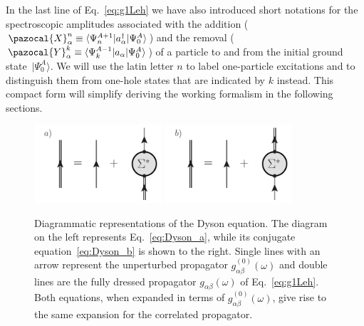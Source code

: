 %
In the last line of Eq.~\eqref{eq:g1Leh} we have also introduced short notations for the spectroscopic amplitudes associated with the addition
($\pazocal{X}^{n}_\alpha \equiv \langle\Psi^{A+1}_n\vert  a^\dagger_\alpha  \vert\Psi^A_0\rangle$) and the removal
($\pazocal{Y}^{k}_\alpha \equiv \langle\Psi^{A-1}_k\vert  a_\alpha  \vert\Psi^A_0\rangle$)  of a particle to and from the initial ground state~$\vert\Psi^A_0\rangle$.
We will use the latin letter  $n$ to label one-particle excitations and to distinguish them from one-hole states that are indicated by $k$ instead.
 This compact form will simplify deriving the working formalism in the following sections. 


\begin{figure}[t]
\begin{center}
\includegraphics[width=0.42\textwidth]{Chapter11-figures/fig11_1_a.pdf}   \hspace{0.08\textwidth} 
\includegraphics[width=0.42\textwidth]{Chapter11-figures/fig11_1_b.pdf}
\caption{Diagrammatic representations of the Dyson equation. The diagram on the left represents Eq.~\eqref{eq:Dyson_a}, while its conjugate equation~\eqref{eq:Dyson_b} is shown to the right. Single lines with an
arrow represent the unperturbed propagator $g^{(0)}_{\alpha\beta}(\omega)$ and  double lines are the fully
dressed propagator $g_{\alpha\beta}(\omega)$ of Eq.~\eqref{eq:g1Leh}.  Both equations, when expanded in terms
of $g^{(0)}_{\alpha\beta}(\omega)$, give rise to the same expansion for the correlated propagator. } 
\label{fig:DysonEq}
\end{center}
\end{figure}

